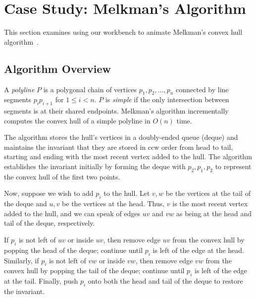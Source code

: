 
\FloatBarrier
\section{Case Study: Melkman's Algorithm}

This section examines using our workbench to animate Melkman's convex hull
algorithm~\cite{melkman1987line}. 


\subsection{Algorithm Overview}

A \emph{polyline} $P$ is a polygonal chain of vertices $p_1, p_2, \ldots, p_n$
connected by line segments $p_ip_{i+1}$ for $1 \leq i < n$. $P$ is \emph{simple}
if the only intersection between segments is at their shared endpoints.
Melkman's algorithm incrementally computes the convex hull of a simple polyline
in $O(n)$ time. 

The algorithm stores the hull's vertices in a doubly-ended queue (deque) and
maintains the invariant that they are stored in ccw order from head to tail,
starting and ending with the most recent vertex added to the hull. The algorithm
establishes the invariant initially by forming the deque with $p_2, p_1, p_2$ to
represent the convex hull of the first two points. 


Now, suppose we wish to add $p_i$ to the hull. Let $v, w$ be the vertices at the
tail of the deque and $u, v$ be the vertices at the head. Thus, $v$ is the most
recent vertex added to the hull, and we can speak of edges $uv$ and $vw$ as
being at the head and tail of the deque, respectively. 


If $p_i$ is not left of $uv$ or inside $uv$, then remove edge $uv$ from the
convex hull by popping the head of the deque; continue until $p_i$ is left of
the edge at the head. Similarly, if $p_i$ is not left of $vw$ or inside $vw$,
then remove edge $vw$ from the convex hull by popping the tail of the deque;
continue until $p_i$ is left of the edge at the tail. Finally, push $p_i$ onto
both the head and tail of the deque to restore the invariant.


